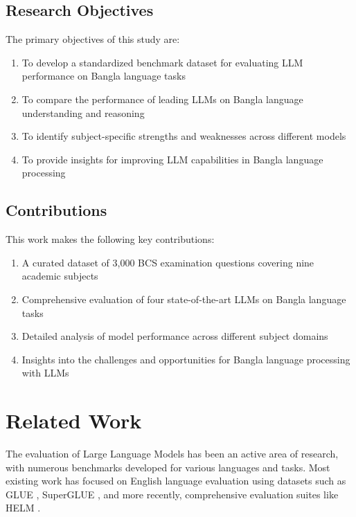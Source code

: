 \documentclass[11pt,a4paper]{article}
\begin{document}
\subsection{Research Objectives}

The primary objectives of this study are:

\begin{enumerate}
    \item To develop a standardized benchmark dataset for evaluating LLM performance on Bangla language tasks
    \item To compare the performance of leading LLMs on Bangla language understanding and reasoning
    \item To identify subject-specific strengths and weaknesses across different models
    \item To provide insights for improving LLM capabilities in Bangla language processing
\end{enumerate}

\subsection{Contributions}

This work makes the following key contributions:

\begin{enumerate}
    \item A curated dataset of 3,000 BCS examination questions covering nine academic subjects
    \item Comprehensive evaluation of four state-of-the-art LLMs on Bangla language tasks
    \item Detailed analysis of model performance across different subject domains
    \item Insights into the challenges and opportunities for Bangla language processing with LLMs
\end{enumerate}

\section{Related Work}

The evaluation of Large Language Models has been an active area of research, with numerous benchmarks developed for various languages and tasks. Most existing work has focused on English language evaluation using datasets such as GLUE \cite{wang2018glue}, SuperGLUE \cite{wang2019superglue}, and more recently, comprehensive evaluation suites like HELM \cite{liang2022holistic}.
\end{document}
